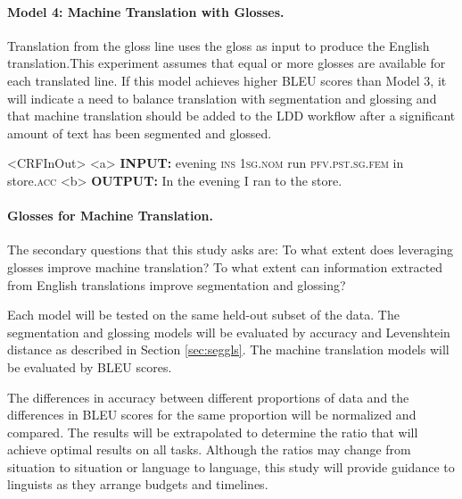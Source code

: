 \paragraph{Model 4: Machine Translation with Glosses.}

Translation from the gloss line uses the gloss as input to produce the English translation.This experiment assumes that equal or more glosses are available for each translated line. If this model achieves higher BLEU scores than Model 3, it will indicate a need to balance translation with segmentation and glossing and that machine translation should be added to the LDD workflow after a significant amount of text has been segmented and glossed. 

\begin{singlespace}
\pex<CRFInOut>   
\label{ex:FTgloss}
\a<a> \textbf{INPUT:} \hspace{5 mm} evening \textsc{ins} \textsc{1sg.nom} run \textsc{pfv.pst.sg.fem} in store.\textsc{acc}
\label{ex:FTglossIn}
\a<b> \textbf{OUTPUT:} \hspace{3 mm} In the evening I ran to the store.
\label{ex:FTglossOut}
\xe
\end{singlespace}


\paragraph{Glosses for Machine Translation.}
The secondary questions that this study asks are:
To what extent does leveraging glosses improve machine translation?  To what extent can information extracted from English translations improve segmentation and glossing?

Each model will be tested on the same held-out subset of the data. The segmentation and glossing models will be evaluated by accuracy and Levenshtein distance as described in Section \ref{sec:seggls}. The machine translation models will be evaluated by BLEU \citep{papineni_bleu:_2002} scores.  

The differences in accuracy between different proportions of data and the differences in BLEU scores for the same proportion will be normalized and compared. The results will be extrapolated to determine the ratio that will achieve optimal results on all tasks. 
Although the ratios may change from situation to situation or language to language, this study will provide guidance to linguists as they arrange budgets and timelines.  

